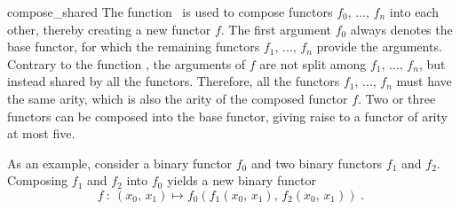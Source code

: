 \begin{ccRefFunction}{compose_shared}
  \ccDefinition The function \ccRefName\ is used to compose functors
  $f_0,\,\ldots,\,f_n$ into each other, thereby creating a new functor
  $f$. The first argument $f_0$ always denotes the base functor, for
  which the remaining functors $f_1,\,\ldots,\,f_n$ provide the
  arguments. Contrary to the function , the arguments of
  $f$ are not split among $f_1,\,\ldots,\,f_n$, but instead shared by
  all the functors. Therefore, all the functors $f_1,\,\ldots,\,f_n$
  must have the same arity, which is also the arity of the composed
  functor $f$. Two or three functors can be composed into the base
  functor, giving raise to a functor of arity at most five.
  
  As an example, consider a binary functor $f_0$ and two binary
  functors $f_1$ and $f_2$. Composing $f_1$ and $f_2$ into $f_0$
  yields a new binary functor
  $$
  f\::\: (x_0,\,x_1) \mapsto
  f_0\left(f_1(x_0,\,x_1),\,f_2(x_0,\,x_1)\right)\;.
  $$
  
  
  
  
  \ccSeeAlso
  \\
  \\
  
\end{ccRefFunction}


